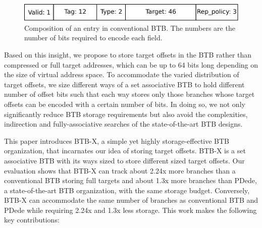 \begin{figure}
\centering
\includegraphics[width=\columnwidth]{figures/i_btb.pdf}
\caption {Composition of an entry in conventional BTB. The numbers are the number of bits required to encode each field.}
\label{fig:conv-btb}
\end{figure}

Based on this insight, we propose to store target offsets in the BTB rather than compressed or full target addresses, which can be up to 64 bits long depending on the size of virtual address space. To accommodate the varied distribution of target offsets, we size different ways of a set associative BTB to hold different number of offset bits such that each way stores only those branches whose target offsets can be encoded with a certain number of bits. In doing so, we not only significantly reduce BTB storage requirements but also avoid the complexities, indirection and fully-associative searches of the state-of-the-art BTB designs.

This paper introduces BTB-X, a simple yet highly storage-effective BTB organization, that incarnates our idea of storing target offsets. BTB-X is a set associative BTB with its ways sized to store different sized target offsets. Our evaluation shows that BTB-X can track about 2.24x more branches than a conventional BTB storing full targets and about 1.3x more branches than PDede, a state-of-the-art BTB organization, with the same storage budget. Conversely, BTB-X can accommodate the same number of branches as conventional BTB and PDede while requiring 2.24x and 1.3x less storage. This work makes the following key contributions:

